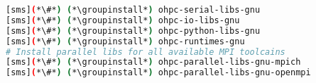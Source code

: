 
\begin{lstlisting}[language=bash,keywords={},upquote=true,keepspaces]
[sms](*\#*) (*\groupinstall*) ohpc-serial-libs-gnu
[sms](*\#*) (*\groupinstall*) ohpc-io-libs-gnu
[sms](*\#*) (*\groupinstall*) ohpc-python-libs-gnu
[sms](*\#*) (*\groupinstall*) ohpc-runtimes-gnu
# Install parallel libs for all available MPI toolcains
[sms](*\#*) (*\groupinstall*) ohpc-parallel-libs-gnu-mpich
[sms](*\#*) (*\groupinstall*) ohpc-parallel-libs-gnu-openmpi
\end{lstlisting}

